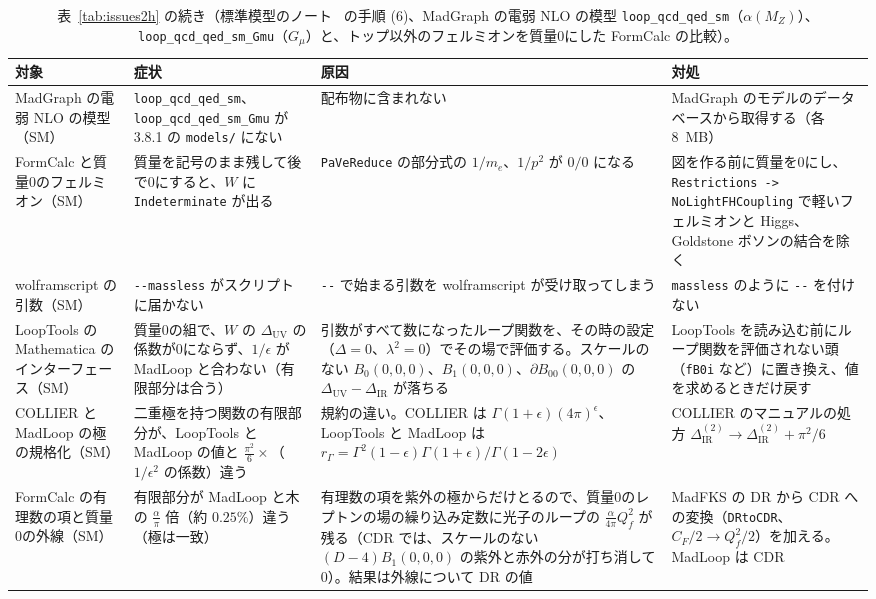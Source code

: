 \documentclass[a4paper,10pt]{ltjsarticle}
\begin{document}
\begin{table}[tbp]
\centering\footnotesize
\caption{表~\ref{tab:issues2h} の続き（標準模型のノート~\cite{smnote} の手順 (6)、MadGraph の電弱 NLO の模型 \texttt{loop\_qcd\_qed\_sm}（$\alpha(M_Z)$）、\texttt{loop\_qcd\_qed\_sm\_Gmu}（$G_\mu$）と、トップ以外のフェルミオンを質量0にした FormCalc の比較）。}
\label{tab:issues2i}
\begin{tabularx}{\linewidth}{>{\raggedright\arraybackslash}p{2.4cm}>{\raggedright\arraybackslash}X>{\raggedright\arraybackslash}X>{\raggedright\arraybackslash}X}
\toprule
\textbf{対象} & \textbf{症状} & \textbf{原因} & \textbf{対処} \\
\midrule
MadGraph の電弱 NLO の模型（SM） & \texttt{loop\_qcd\_qed\_sm}、\texttt{loop\_qcd\_qed\_sm\_Gmu} が 3.8.1 の \texttt{models/} にない & 配布物に含まれない & MadGraph のモデルのデータベースから取得する（各 8~MB） \\
FormCalc と質量0のフェルミオン（SM） & 質量を記号のまま残して後で0にすると、$W$ に \texttt{Indeterminate} が出る & \texttt{PaVeReduce} の部分式の $1/m_e$、$1/p^2$ が $0/0$ になる & 図を作る前に質量を0にし、\texttt{Restrictions -> NoLightFHCoupling} で軽いフェルミオンと Higgs、Goldstone ボソンの結合を除く \\
wolframscript の引数（SM） & \texttt{-{}-massless} がスクリプトに届かない & \texttt{-{}-} で始まる引数を wolframscript が受け取ってしまう & \texttt{massless} のように \texttt{-{}-} を付けない \\
LoopTools の Mathematica のインターフェース（SM） & 質量0の組で、$W$ の $\Delta_{\mathrm{UV}}$ の係数が0にならず、$1/\epsilon$ が MadLoop と合わない（有限部分は合う） & 引数がすべて数になったループ関数を、その時の設定（$\Delta=0$、$\lambda^2=0$）でその場で評価する。スケールのない $B_0(0,0,0)$、$B_1(0,0,0)$、$\partial B_{00}(0,0,0)$ の $\Delta_{\mathrm{UV}}-\Delta_{\mathrm{IR}}$ が落ちる & LoopTools を読み込む前にループ関数を評価されない頭（\texttt{fB0i} など）に置き換え、値を求めるときだけ戻す \\
COLLIER と MadLoop の極の規格化（SM） & 二重極を持つ関数の有限部分が、LoopTools と MadLoop の値と $\frac{\pi^2}6\times$（$1/\epsilon^2$ の係数）違う & 規約の違い。COLLIER は $\Gamma(1+\epsilon)(4\pi)^\epsilon$、LoopTools と MadLoop は $r_\Gamma=\Gamma^2(1-\epsilon)\Gamma(1+\epsilon)/\Gamma(1-2\epsilon)$ & COLLIER のマニュアルの処方 $\Delta^{(2)}_{\mathrm{IR}}\to\Delta^{(2)}_{\mathrm{IR}}+\pi^2/6$ \\
FormCalc の有理数の項と質量0の外線（SM） & 有限部分が MadLoop と木の $\frac\alpha\pi$ 倍（約 $0.25\%$）違う（極は一致） & 有理数の項を紫外の極からだけとるので、質量0のレプトンの場の繰り込み定数に光子のループの $\frac{\alpha}{4\pi}Q_f^2$ が残る（CDR では、スケールのない $(D-4)B_1(0,0,0)$ の紫外と赤外の分が打ち消して0）。結果は外線について DR の値 & MadFKS の DR から CDR への変換（\texttt{DRtoCDR}、$C_F/2\to Q_f^2/2$）を加える。MadLoop は CDR \\
\bottomrule
\end{tabularx}
\end{table}
\end{document}
